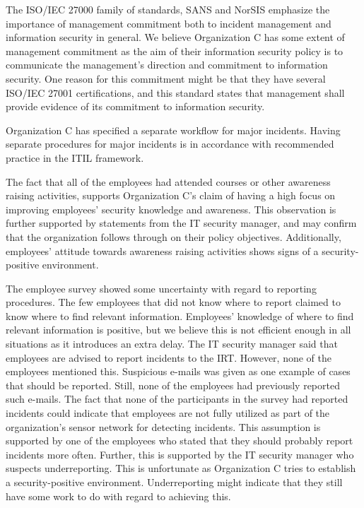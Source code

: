The ISO/IEC 27000 family of standards, SANS and NorSIS emphasize the importance of management commitment both to incident management and information security in general. We believe Organization C has some extent of management commitment as the aim of their information security policy is to communicate the management's direction and commitment to information security. One reason for this commitment might be that they have several ISO/IEC 27001 certifications, and this standard states that management shall provide evidence of its commitment to information security. 

Organization C has specified a separate workflow for major incidents. Having separate procedures for major incidents is in accordance with recommended practice in the ITIL framework. 
 
The fact that all of the employees had attended courses or other awareness raising activities, supports Organization C's claim of having a high focus on improving employees' security knowledge and awareness. This observation is further supported by statements from the IT security manager, and may confirm that the organization follows through on their policy objectives. Additionally, employees' attitude towards awareness raising activities shows signs of a security-positive environment.  
 
The employee survey showed some uncertainty with regard to reporting procedures. The few employees that did not know where to report claimed to know where to find relevant information. Employees' knowledge of where to find relevant information is positive, but we believe this is not efficient enough in all situations as it introduces an extra delay. The IT security manager said that employees are advised to report incidents to the \ac{IRT}. However, none of the employees mentioned this. Suspicious e-mails was given as one example of cases that should be reported. Still, none of the employees had previously reported such e-mails. The fact that none of the participants in the survey had reported incidents could indicate that employees are not fully utilized as part of the organization's sensor network for detecting incidents. This assumption is supported by one of the employees who stated that they should probably report incidents more often. Further, this is supported by the IT security manager who suspects underreporting. This is unfortunate as Organization C tries to establish a security-positive environment. Underreporting might indicate that they still have some work to do with regard to achieving this. 

